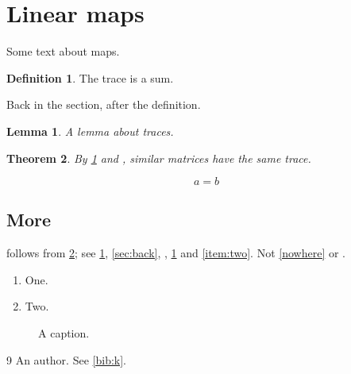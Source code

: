 \documentclass{article}
\newtheorem{theorem}{Theorem}[section]
\newtheorem{lemma}[theorem]{Lemma}
\theoremstyle{definition}
\newtheorem{definition}{Definition}
\begin{document}
\section{Linear maps}\label{sec:maps}
Some text about maps.

\begin{definition}\label{def:trace}
The trace is a sum.
\end{definition}
Back in the section,\label{sec:back} after the definition.

\begin{lemma}\label{lem:cyclic}
A lemma about traces.
\end{lemma}

\begin{theorem}\label{thm:similar}
By \cref{lem:cyclic} and , similar matrices have the same trace.
\end{theorem}
\begin{equation}\label{eq:main}
a = b
\end{equation}
\subsection{More}\label{sec:more}
 follows from \cref{thm:similar}; see \cref{sec:maps}, \cref{sec:back}, , \cref{fig:one} and \cref{item:two}. Not \cref{nowhere} or .
\begin{enumerate}
\item One.
\item Two.\label{item:two}
\end{enumerate}
\begin{figure}[h]
\centering
\caption{A caption.}\label{fig:one}
\end{figure}
\begin{thebibliography}{9}
 An author.\label{bib:k} See \cref{bib:k}.
\end{thebibliography}
\end{document}
